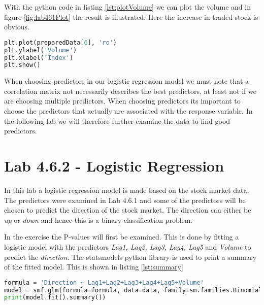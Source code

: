 \FloatBarrier

With the python code in listing \ref{lst:plotVolume} we can plot the volume and in figure \ref{fig:lab461Plot} the result is illustrated. Here the increase in traded stock is obvious.
\begin{lstlisting}[language=Python, label=lst:plotVolume, caption=print correlation matrix]
plt.plot(preparedData[6], 'ro')
plt.ylabel('Volume')
plt.xlabel('Index')
plt.show()
\end{lstlisting}


When choosing predictors in our logistic regression model we must note that a correlation matrix not necessarily describes the best predictors, at least not if we are choosing multiple predictors. When choosing predictors its important to choose the predictors that actually are associated with the response variable. In the following lab we will therefore further examine the data to find good predictors.

\section{Lab 4.6.2 - Logistic Regression}
In this lab a logistic regression model is made based on the stock market data. The predictors were examined in Lab 4.6.1 and some of the predictors will be chosen to predict the direction of the stock market. The direction can either be \emph{up} or \emph{down} and hence this is a binary classification problem.

In the exercise the P-values will first be examined. This is done by fitting a logistic model with the predictors \emph{Lag1, Lag2, Lag3, Lag4, Lag5} and \emph{Volume} to predict the \emph{direction}.  The statsmodels python library is used to print a summary of the fitted model. This is shown in listing \ref{lst:summary}
\begin{lstlisting}[language=Python, label=lst:summary, caption=print correlation matrix]
formula = 'Direction ~ Lag1+Lag2+Lag3+Lag4+Lag5+Volume'
model = smf.glm(formula=formula, data=data, family=sm.families.Binomial())
print(model.fit().summary())
\end{lstlisting}

\FloatBarrier

